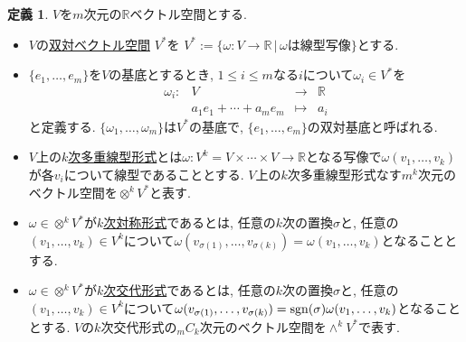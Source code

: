 \documentclass[dvipdfmx,a4paper,11pt]{article}
\newcommand{\R}{\mathbb{R}}
\newcommand{\sgn}{{\rm sgn}}
\theoremstyle{definition}
\newtheorem{dfn}[thm]{定義}
\begin{document}
    \begin{tcolorbox}[
    colback = white,
    colframe = green!35!black,
    fonttitle = \bfseries,
    breakable = true]
\begin{dfn}
$V$を$m$次元の$\R$ベクトル空間とする.
\begin{itemize}
 \setlength{\parskip}{0cm}
  \setlength{\itemsep}{2pt} 
\item $V$の\underline{双対ベクトル空間} $V^{*}$を
$
V^{*} := \{\omega : V \rightarrow \R  \,|\, \text{$\omega$は線型写像} \}
\text{とする.}
$
\item $\{ e_1, \ldots, e_m\}$を$V$の基底とするとき, $1 \le i \le m$なる$i$について$\omega_{i} \in V^{*}$を
     $$
      \begin{matrix}
     \omega_{i} : &V & \rightarrow &\R\\
      &a_1e_1 + \cdots +a_m e_m& \mapsto& a_i
       \end{matrix}
      $$
 と定義する. $\{ \omega_1, \ldots, \omega_m\}$は$V^{*}$の基底で, $\{ e_1, \ldots, e_m\}$の双対基底と呼ばれる.
 \item $V$上の\underline{$k$次多重線型形式}とは$\omega : V^{k}=V \times \cdots \times V \rightarrow \R$となる写像で$\omega(v_1, \ldots, v_k)$が各$v_i$について線型であることとする. $V$上の$k$次多重線型形式なす$m^k$次元のベクトル空間を$\otimes^{k} V^{*}$と表す.
   \item $\omega \in \otimes^{k} V^{*}$が\underline{$k$次対称形式}であるとは, 任意の$k$次の置換$\sigma$と, 任意の$(v_1, \ldots, v_k )\in V^{k}$について$\omega(v_{\sigma(1)}, \ldots, v_{\sigma(k)})=\omega(v_1, \ldots, v_k)$となることとする.
  \item $\omega \in \otimes^{k} V^{*}$が\underline{$k$次交代形式}であるとは, 任意の$k$次の置換$\sigma$と, 任意の$(v_1, \ldots, v_k) \in V^{k}$について$\omega(v_{\sigma(1)}, \ldots, v_{\sigma(k)})=\sgn(\sigma)\omega(v_1, \ldots, v_k)$となることとする. $V$の$k$次交代形式の${}_m C_{k}$次元のベクトル空間を$\wedge^{k} V^{*}$で表す. 
\end{itemize}

    \end{dfn}
    \end{tcolorbox}
\end{document}
